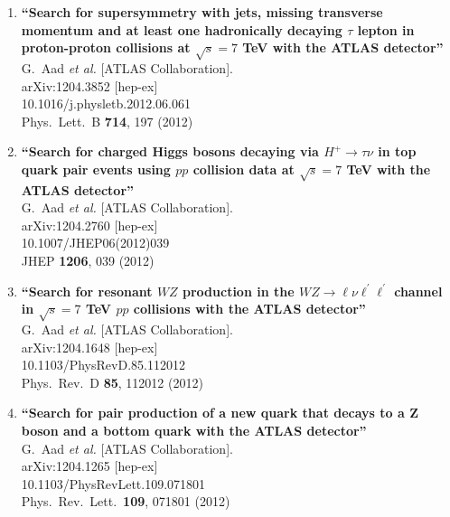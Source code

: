 \documentclass{article}
\begin{document}
\begin{enumerate}
\item%
{\bf ``Search for supersymmetry with jets, missing transverse momentum and at least one hadronically decaying $\tau$ lepton in proton-proton collisions at $\sqrt{s}=7$ TeV with the ATLAS detector''}
  \\{}G.~Aad {\it et al.}  [ATLAS Collaboration].
  \\{}arXiv:1204.3852 [hep-ex]
    \\{}10.1016/j.physletb.2012.06.061
\\{}Phys.\ Lett.\ B {\bf 714}, 197 (2012) %


\item%
{\bf ``Search for charged Higgs bosons decaying via $H^{+} \to \tau \nu$ in top quark pair events using $pp$ collision data at $\sqrt{s}=7$ TeV with the ATLAS detector''}
  \\{}G.~Aad {\it et al.}  [ATLAS Collaboration].
  \\{}arXiv:1204.2760 [hep-ex]
    \\{}10.1007/JHEP06(2012)039
\\{}JHEP {\bf 1206}, 039 (2012) %


\item%
{\bf ``Search for resonant $WZ$ production in the $WZ \to \ell \nu \ell^\prime\ell^\prime$ channel in $\sqrt{s}=7$ TeV $pp$ collisions with the ATLAS detector''}
  \\{}G.~Aad {\it et al.}  [ATLAS Collaboration].
  \\{}arXiv:1204.1648 [hep-ex]
    \\{}10.1103/PhysRevD.85.112012
\\{}Phys.\ Rev.\ D {\bf 85}, 112012 (2012) %


\item%
{\bf ``Search for pair production of a new quark that decays to a Z boson and a bottom quark with the ATLAS detector''}
  \\{}G.~Aad {\it et al.}  [ATLAS Collaboration].
  \\{}arXiv:1204.1265 [hep-ex]
    \\{}10.1103/PhysRevLett.109.071801
\\{}Phys.\ Rev.\ Lett.\  {\bf 109}, 071801 (2012) %



\end{enumerate}
\end{document}
